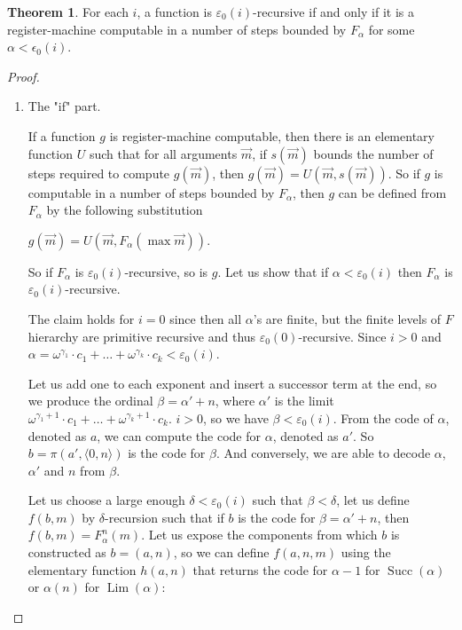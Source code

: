 \documentclass[8pt]{article}
\theoremstyle{definition}
\theoremstyle{definition}
\newtheorem{theorem}{Theorem}[section]
\theoremstyle{definition}
\theoremstyle{definition}
\theoremstyle{definition}
\theoremstyle{definition}
\theoremstyle{definition}
\theoremstyle{definition}
\theoremstyle{definition}
\theoremstyle{definition}
\theoremstyle{definition}
\theoremstyle{definition}
\theoremstyle{definition}
\theoremstyle{question}
\begin{document}
\begin{theorem}
  For each $i$, a function is $\varepsilon_0(i)$-recursive if and only if it is a register-machine computable
  in a number of steps bounded by $F_{\alpha}$ for some $\alpha < \epsilon_0(i)$.
\end{theorem}

\begin{proof}

  \begin{enumerate}
    \item The "if" part.

    If a function $g$ is register-machine computable, then there is an elementary function $U$ such that for all
    arguments $\vec{m}$, if $s(\vec{m})$ bounds the number of steps required to compute $g(\vec{m})$,
    then $g(\vec{m}) = U(\vec{m}, s(\vec{m}))$. So if $g$ is computable in a number of steps bounded by $F_{\alpha}$, then
    $g$ can be defined from $F_{\alpha}$ by the following substitution
    \begin{center}
      $g(\vec{m}) = U(\vec{m}, F_{\alpha}(\max \vec{m}))$.
    \end{center} 

    So if $F_{\alpha}$ is $\varepsilon_0(i)$-recursive, so is $g$. Let us show that if $\alpha < \varepsilon_0(i)$ then
    $F_{\alpha}$ is $\varepsilon_0(i)$-recursive.

    The claim holds for $i = 0$ since then all $\alpha$'s are finite, but the finite levels of $F$ hierarchy
    are primitive recursive and thus $\varepsilon_0(0)$-recursive. Since $i > 0$ and
    $\alpha = \omega^{\gamma_1} \cdot c_1 + \dots + \omega^{\gamma_k} \cdot c_k < \varepsilon_0(i)$.
    
    Let us add one to each exponent and insert a successor term at the end, so we produce the ordinal $\beta = \alpha' + n$,
    where $\alpha'$ is the limit $\omega^{\gamma_1 + 1} \cdot c_1 + \dots + \omega^{\gamma_k + 1} \cdot c_k$.
    $i > 0$, so we have $\beta < \varepsilon_0(i)$. From the code of $\alpha$, denoted as $a$, we can compute the code
    for $\alpha$, denoted as $a'$. So $b = \pi(a', \langle 0, n \rangle)$ is the code for $\beta$. And conversely, we are able
    to decode $\alpha$, $\alpha'$ and $n$ from $\beta$. 

    Let us choose a large enough $\delta < \varepsilon_0(i)$ such that $\beta < \delta$, let us define $f(b, m)$ by $\delta$-recursion
    such that if $b$ is the code for $\beta = \alpha' + n$, then $f(b, m) = F^n_{\alpha}(m)$.
    Let us expose the components from which $b$ is constructed as $b = (a, n)$, so we can define $f(a, n, m)$ using the elementary function
    $h(a,n)$ that returns the code for $\alpha - 1$ for $\operatorname{Succ}(\alpha)$ or $\alpha(n)$ for $\operatorname{Lim}(\alpha)$:


\end{enumerate}
\end{proof}
\end{document}
